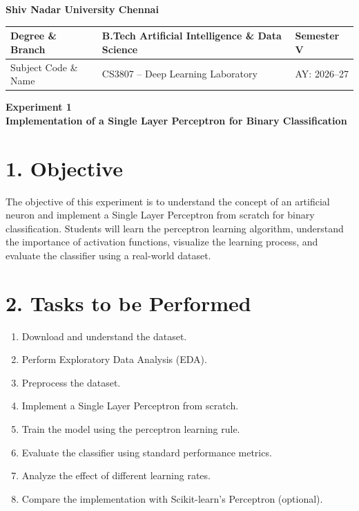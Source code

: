 \documentclass[11pt]{article}
\begin{document}
\begin{center}
\Large\textbf{Shiv Nadar University Chennai}\\[2mm]
\end{center}

\renewcommand{\arraystretch}{1.4}

\begin{tabular}{|p{3.5cm}|p{8cm}|p{2cm}|}
\hline
Degree \& Branch & B.Tech Artificial Intelligence \& Data Science & Semester V\\ \hline
Subject Code \& Name & CS3807 -- Deep Learning Laboratory & AY: 2026--27\\ \hline
\end{tabular}

\vspace{3mm}

\begin{center}
\Large\textbf{Experiment 1}\\
\large\textbf{Implementation of a Single Layer Perceptron for Binary Classification}
\end{center}


\section*{1. Objective}

The objective of this experiment is to understand the concept of an artificial neuron and implement a Single Layer Perceptron from scratch for binary classification. Students will learn the perceptron learning algorithm, understand the importance of activation functions, visualize the learning process, and evaluate the classifier using a real-world dataset.


\section*{2. Tasks to be Performed}

\begin{enumerate}[leftmargin=*]
\item Download and understand the dataset.
\item Perform Exploratory Data Analysis (EDA).
\item Preprocess the dataset.
\item Implement a Single Layer Perceptron from scratch.
\item Train the model using the perceptron learning rule.
\item Evaluate the classifier using standard performance metrics.
\item Analyze the effect of different learning rates.
\item Compare the implementation with Scikit-learn's Perceptron (optional).
\end{enumerate}
\end{document}
